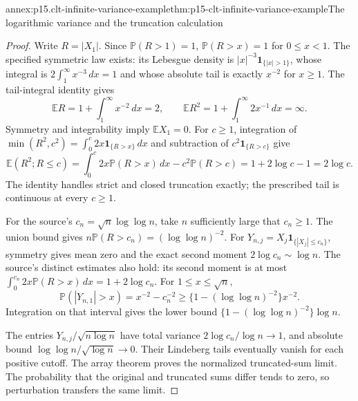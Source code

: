 \begin{annexitem}{annex:p15.clt-infinite-variance-example}{thm:p15-clt-infinite-variance-example}{The logarithmic variance and the truncation calculation}
\begin{proof}
Write \(R=|X_1|\). Since \(\mathbb P(R>1)=1\),
\(\mathbb P(R>x)=1\) for \(0\leq x<1\).
The specified symmetric law exists: its Lebesgue density is
\(|x|^{-3}\mathbf1_{\{|x|>1\}}\), whose integral is
\(2\int_1^\infty x^{-3}\,dx=1\) and whose absolute tail is
exactly \(x^{-2}\) for \(x\geq1\).
The tail-integral identity gives
\[
 \mathbb ER=1+\int_1^\infty x^{-2}\,dx=2,\qquad
 \mathbb ER^2=1+\int_1^\infty2x^{-1}\,dx=\infty.
 \]
Symmetry and integrability imply \(\mathbb EX_1=0\).
For \(c\geq1\), integration of
\(\min(R^2,c^2)=\int_0^c2x\mathbf1_{\{R>x\}}\,dx\)
and subtraction of \(c^2\mathbf1_{\{R>c\}}\) give
\[
 \mathbb E(R^2;R\leq c)
 =\int_0^c2x\mathbb P(R>x)\,dx-c^2\mathbb P(R>c)
 =1+2\log c-1=2\log c.
 \]
The identity handles strict and closed truncation exactly; the
prescribed tail is continuous at every \(c\geq1\).

For the source's \(c_n=\sqrt n\log\log n\), take \(n\)
sufficiently large that \(c_n\geq1\).
The union bound gives \(n\mathbb P(R>c_n)=(\log\log n)^{-2}\).
For \(Y_{n,j}=X_j\mathbf1_{\{|X_j|\leq c_n\}}\), symmetry gives
mean zero and the exact second moment \(2\log c_n\sim\log n\).
The source's distinct estimates also hold: its second moment is at
most \(\int_0^{c_n}2x\mathbb P(R>x)\,dx=1+2\log c_n\).
For \(1\leq x\leq\sqrt n\),
\[
 \mathbb P(|Y_{n,1}|>x)
 =x^{-2}-c_n^{-2}
 \geq\{1-(\log\log n)^{-2}\}x^{-2}.
 \]
Integration on that interval gives the lower bound
\(\{1-(\log\log n)^{-2}\}\log n\).

The entries \(Y_{n,j}/\sqrt{n\log n}\) have total variance
\(2\log c_n/\log n\to1\), and absolute bound
\(\log\log n/\sqrt{\log n}\to0\).
Their Lindeberg tails eventually vanish for each positive cutoff.
The array theorem proves the normalized truncated-sum limit.
The probability that the original and truncated sums differ
tends to zero, so perturbation transfers the same limit.
\end{proof}
\end{annexitem}

